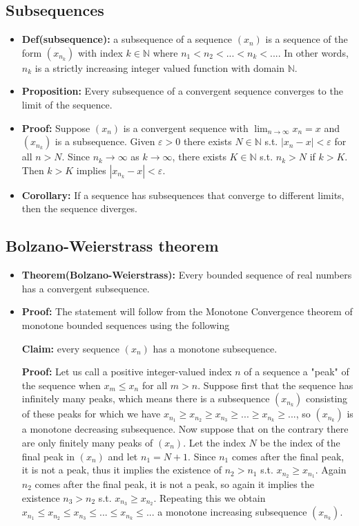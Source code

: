 \documentclass{article}
\begin{document}
\subsection{Subsequences}
\begin{itemize}
    \item \textbf{Def(subsequence):} a subsequence of a sequence $(x_n)$ is a sequence of the form $(x_{n_k})$ with index $k \in \mathbb{N}$ where $n_1 < n_2 < ... < n_k < ....$ In other words, $n_k$ is a strictly increasing integer valued function with domain $\mathbb{N}$.
    \item \textbf{Proposition:} Every subsequence of a convergent sequence converges to the limit of the sequence.
    \item \textbf{Proof:} Suppose $(x_n)$ is a convergent sequence with $\displaystyle \lim_{n\to\infty} x_n = x$ and $(x_{n_k})$ is a subsequence. Given $\varepsilon > 0$ there exists $N \in \mathbb{N}$ s.t. $|x_n - x| < \varepsilon$ for all $n > N$. Since $n_k \to \infty$ as $k \to \infty$, there exists $K \in \mathbb{N}$ s.t. $n_k > N$ if $k > K$. Then $k > K$ implies $|x_{n_k} - x| < \varepsilon$.
    \item \textbf{Corollary:} If a sequence has subsequences that converge to different limits, then the sequence diverges.
\end{itemize}

\subsection{Bolzano-Weierstrass theorem}
\begin{itemize}
    \item \textbf{Theorem(Bolzano-Weierstrass):} Every bounded sequence of real numbers has a convergent subsequence. 
    \item \textbf{Proof:} The statement will follow from the Monotone Convergence theorem of monotone bounded sequences using the following 
    
    \textbf{Claim:} every sequence $(x_n)$ has a monotone subsequence. 

    \textbf{Proof:} Let us call a positive integer-valued index $n$ of a sequence a "peak" of the sequence when $x_m \leq x_n$ for all $m > n$. Suppose first that the sequence has infinitely many peaks, which means there is a subsequence $(x_{n_k})$ consisting of these peaks for which we have $x_{n_1} \geq x_{n_2} \geq x_{n_3} \geq ... \geq x_{n_k} \geq ...$, so $(x_{n_k})$ is a monotone decreasing subsequence. Now suppose that on the contrary there are only finitely many peaks of $(x_n)$. Let the index $N$ be the index of the final peak in $(x_n)$ and let $n_1 = N + 1$. Since $n_1$ comes after the final peak, it is not a peak, thus it implies the existence of $n_2 > n_1$ s.t. $x_{n_2} \geq x_{n_1}$. Again $n_2$ comes after the final peak, it is not a peak, so again it implies the existence $n_3 > n_2$ s.t. $x_{n_3} \geq x_{n_2}$. Repeating this we obtain $x_{n_1} \leq x_{n_2} \leq x_{n_3} \leq ... \leq x_{n_k} \leq ...$ a monotone increasing subsequence $(x_{n_k})$.
\end{itemize}
\end{document}

